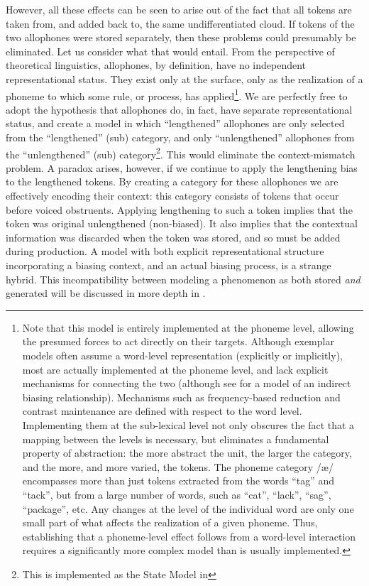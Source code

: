 However, all these effects can be seen to arise out of the fact that
all tokens are taken from, and added back to, the same undifferentiated
cloud. If tokens of the two allophones were stored separately, then
these problems could presumably be eliminated. Let us consider what
that would entail. From the perspective of theoretical linguistics,
allophones, by definition, have no independent representational status.
They exist only at the surface, only as the realization of a phoneme
to which some rule, or process, has applied\footnote{Note that this model is entirely implemented at the phoneme level,
allowing the presumed forces to act directly on their targets. Although
exemplar models often assume a word-level representation (explicitly
or implicitly), most are actually implemented at the phoneme level,
and lack explicit mechanisms for connecting the two (although see
\citet{Wedel2008} for a model of an indirect biasing relationship).
Mechanisms such as frequency-based reduction and contrast maintenance
are defined with respect to the word level. Implementing them at the
sub-lexical level not only obscures the fact that a mapping between
the levels is necessary, but eliminates a fundamental property of
abstraction: the more abstract the unit, the larger the category,
and the more, and more varied, the tokens. The phoneme category {/æ/}
encompasses more than just tokens extracted from the words “tag”
and “tack”, but from a large number of words, such as “cat”,
“lack”, “sag”, “package”, etc. Any changes at the
level of the individual word are only one small part of what affects
the realization of a given phoneme. Thus, establishing that a phoneme-level
effect follows from a word-level interaction requires a significantly
more complex model than is usually implemented. }. We are perfectly free to adopt the hypothesis that allophones do,
in fact, have separate representational status, and create a model
in which “lengthened” allophones are only selected from the
“lengthened” (sub) category, and only “unlengthened” allophones
from the “unlengthened” (sub) category\footnote{This is implemented as the State Model in }.
This would eliminate the context-mismatch problem. A paradox arises,
however, if we continue to apply the lengthening bias to the lengthened
tokens. By creating a category for these allophones we are effectively
encoding their context: this category consists of tokens that occur
before voiced obstruents. Applying lengthening to such a token implies
that the token was original unlengthened (non-biased). It also implies
that the contextual information was discarded when the token was stored,
and so must be added during production. A model with both explicit
representational structure incorporating a biasing context, and an
actual biasing process, is a strange hybrid. This incompatibility
between modeling a phenomenon as both stored \emph{and} generated
will be discussed in more depth in . 

